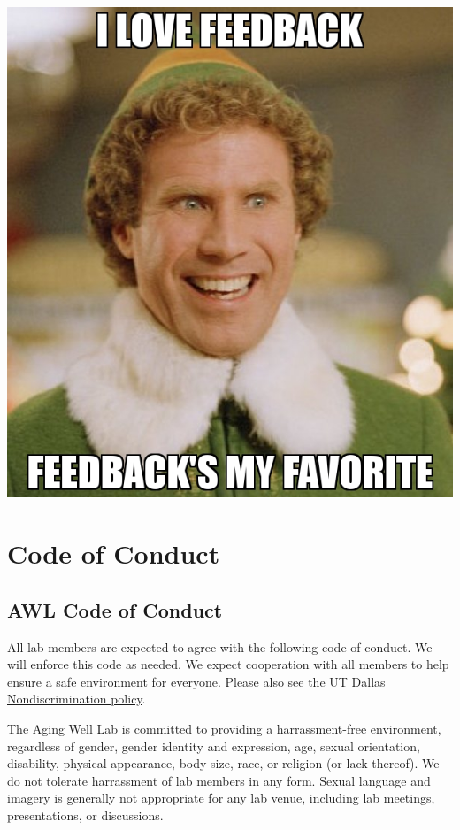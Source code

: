\documentclass[]{book}
\begin{document}
\includegraphics{images/i-love-feedback.jpg}

\hypertarget{code-of-conduct}{%
\chapter{Code of Conduct}\label{code-of-conduct}}

\hypertarget{awl-code-of-conduct}{%
\section{AWL Code of Conduct}\label{awl-code-of-conduct}}

All lab members are expected to agree with the following code of conduct. We will enforce this code as needed. We expect cooperation with all members to help ensure a safe environment for everyone. Please also see the \href{https://policy.utdallas.edu/utdbp3090}{UT Dallas Nondiscrimination policy}.

The Aging Well Lab is committed to providing a harrassment-free environment, regardless of gender, gender identity and expression, age, sexual orientation, disability, physical appearance, body size, race, or religion (or lack thereof). We do not tolerate harrassment of lab members in any form. Sexual language and imagery is generally not appropriate for any lab venue, including lab meetings, presentations, or discussions.
\end{document}
